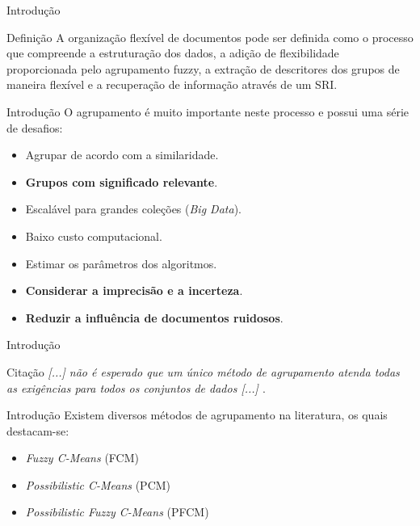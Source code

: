 \documentclass[brazil]{beamer}
\begin{document}
\begin{frame}{Introdução}
  \begin{block}{Definição}
    A \alert{organização flexível de documentos} pode ser definida como o processo que compreende a
    \alert{estruturação dos dados}, a adição de flexibilidade proporcionada pelo \alert{agrupamento
    fuzzy}, a \alert{extração de descritores} dos grupos de maneira flexível e a recuperação de
    informação através de um SRI.
  \end{block}
\end{frame}

\begin{frame}{Introdução}
  O agrupamento é muito importante neste processo e possui uma série de desafios:
  \begin{itemize}
    \item<1 -> Agrupar de acordo com a similaridade. 
    \item<2 -> \textbf{Grupos com significado relevante}.
    \item<3 -> Escalável para grandes coleções ({\it Big Data\/}).
    \item<4 -> Baixo custo computacional.
    \item<5 -> Estimar os parâmetros dos algoritmos.
    \item<6 -> \textbf{Considerar a imprecisão e a incerteza}.
    \item<7 -> \textbf{Reduzir a influência de \alert{documentos ruidosos}}. 
  \end{itemize} 
\end{frame}

\begin{frame}{Introdução}
  \begin{block}{Citação}
    {\it [...] não é esperado que um único método de agrupamento atenda
    todas as exigências para todos os conjuntos de dados [...] \cite{Steinbach2004}\/}.
  \end{block}
\end{frame}

\begin{frame}{Introdução}
  Existem diversos métodos de agrupamento na literatura, os quais destacam-se:
  \begin{itemize}
    \item {\it Fuzzy C-Means\/} (FCM) 
    \item {\it Possibilistic C-Means\/} (PCM) 
    \item {\it Possibilistic Fuzzy C-Means\/} (PFCM) 
  \end{itemize} 

\end{frame}
\end{document}
